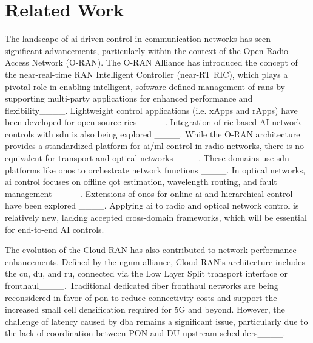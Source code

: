 \section{Related Work}
The landscape of \ac{ai}-driven control in communication networks has seen significant advancements, particularly within the context of the Open Radio Access Network (O-RAN). The O-RAN Alliance has introduced the concept of the near-real-time RAN Intelligent Controller (near-RT RIC), which plays a pivotal role in enabling intelligent, software-defined management of \acp{ran} by supporting multi-party applications for enhanced performance and flexibility____. Lightweight control applications (i.e. xApps and rApps) have been developed for open-source \acp{ric} ____. Integration of \ac{ric}-based AI network controls with \ac{sdn} is also being explored ____. While the O-RAN architecture provides a standardized platform for \ac{ai}/\ac{ml} control in radio networks, there is no equivalent for transport and optical networks____. These domains use \ac{sdn} platforms like \ac{onos} to orchestrate network functions ____. In optical networks, \ac{ai} control focuses on offline \ac{qot} estimation, wavelength routing, and fault management ____. Extensions of \ac{onos} for online \ac{ai} and hierarchical control have been explored ____. Applying \ac{ai} to radio and optical network control is relatively new, lacking accepted cross-domain frameworks, which will be essential for end-to-end AI controls. 



The evolution of the Cloud-RAN has also contributed to network performance enhancements. Defined by the \ac{ngnm} alliance, Cloud-RAN's architecture includes the \ac{cu}, \ac{du}, and \ac{ru}, connected via the Low Layer Split transport interface or fronthaul____. Traditional dedicated fiber fronthaul networks are being reconsidered in favor of \ac{pon} to reduce connectivity costs and support the increased small cell densification required for 5G and beyond. However, the challenge of latency caused by \ac{dba} remains a significant issue, particularly due to the lack of coordination between PON and DU upstream schedulers____.

